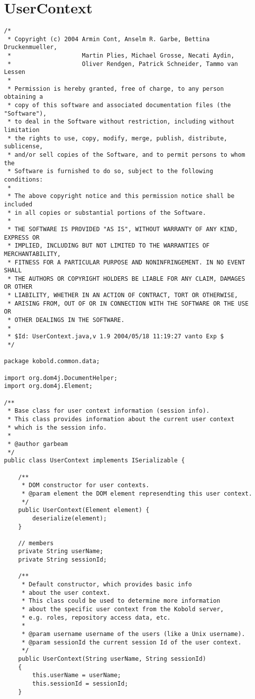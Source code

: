 \section{UserContext}
\small \begin{verbatim}
/*
 * Copyright (c) 2004 Armin Cont, Anselm R. Garbe, Bettina Druckenmueller,
 *                    Martin Plies, Michael Grosse, Necati Aydin,
 *                    Oliver Rendgen, Patrick Schneider, Tammo van Lessen
 * 
 * Permission is hereby granted, free of charge, to any person obtaining a
 * copy of this software and associated documentation files (the "Software"),
 * to deal in the Software without restriction, including without limitation
 * the rights to use, copy, modify, merge, publish, distribute, sublicense,
 * and/or sell copies of the Software, and to permit persons to whom the
 * Software is furnished to do so, subject to the following conditions:
 * 
 * The above copyright notice and this permission notice shall be included
 * in all copies or substantial portions of the Software.
 * 
 * THE SOFTWARE IS PROVIDED "AS IS", WITHOUT WARRANTY OF ANY KIND, EXPRESS OR
 * IMPLIED, INCLUDING BUT NOT LIMITED TO THE WARRANTIES OF MERCHANTABILITY,
 * FITNESS FOR A PARTICULAR PURPOSE AND NONINFRINGEMENT. IN NO EVENT SHALL
 * THE AUTHORS OR COPYRIGHT HOLDERS BE LIABLE FOR ANY CLAIM, DAMAGES OR OTHER
 * LIABILITY, WHETHER IN AN ACTION OF CONTRACT, TORT OR OTHERWISE,
 * ARISING FROM, OUT OF OR IN CONNECTION WITH THE SOFTWARE OR THE USE OR
 * OTHER DEALINGS IN THE SOFTWARE.
 * 
 * $Id: UserContext.java,v 1.9 2004/05/18 11:19:27 vanto Exp $
 */

package kobold.common.data;

import org.dom4j.DocumentHelper;
import org.dom4j.Element;

/**
 * Base class for user context information (session info).
 * This class provides information about the current user context
 * which is the session info.
 *
 * @author garbeam
 */
public class UserContext implements ISerializable {
	
    /**
     * DOM constructor for user contexts.
	 * @param element the DOM element represendting this user context.
	 */
	public UserContext(Element element) {
		deserialize(element);
	}

	// members
	private String userName;
	private String sessionId;
	 
    /**
     * Default constructor, which provides basic info
     * about the user context.
     * This class could be used to determine more information
     * about the specific user context from the Kobold server,
     * e.g. roles, repository access data, etc.
     *
     * @param username username of the users (like a Unix username).
     * @param sessionId the current session Id of the user context.
     */
    public UserContext(String userName, String sessionId)
    {
        this.userName = userName;
        this.sessionId = sessionId;
    }


\end{verbatim}
